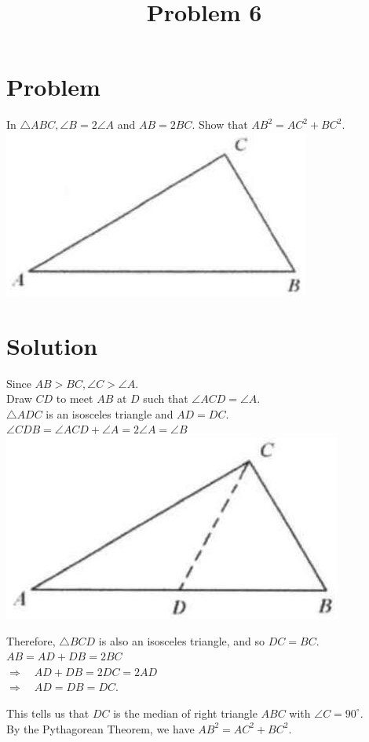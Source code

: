 \documentclass{article}
\title{Problem 6}
\date{}
\begin{document}
\maketitle

\section*{Problem}
In \(\triangle A B C, \angle B=2 \angle A\) and \(A B=2 B C\). Show that \(A B^{2}=A C^{2}+B C^{2}\).\\
\centering
\includegraphics[width=\textwidth]{images/problem_image_1.jpg}

\section*{Solution}
Since \(A B>B C, \angle C>\angle A\).\\
Draw \(C D\) to meet \(A B\) at \(D\) such that \(\angle A C D=\angle A\).\\
\(\triangle A D C\) is an isosceles triangle and \(A D=D C\).\\
\(\angle C D B=\angle A C D+\angle A=2 \angle A=\angle B\)\\
\centering
\includegraphics[width=\textwidth]{images/reasoning_image_1.jpg}

Therefore, \(\triangle B C D\) is also an isosceles triangle, and so \(D C=B C\).\\
\(A B=A D+D B=2 B C\)\\
\(\Rightarrow \quad A D+D B=2 D C=2 A D\)\\
\(\Rightarrow \quad A D=D B=D C\).

This tells us that \(D C\) is the median of right triangle \(A B C\) with \(\angle C=90^{\circ}\).\\
By the Pythagorean Theorem, we have \(A B^{2}=A C^{2}+B C^{2}\).
\end{document}
